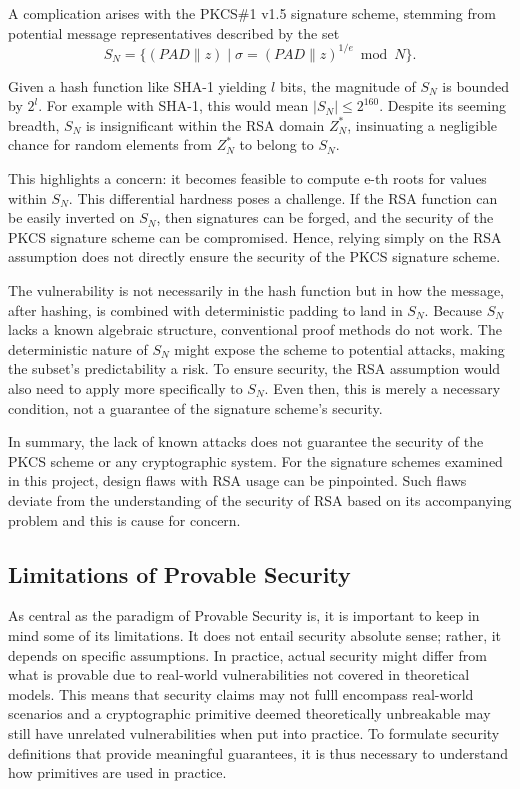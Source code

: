 \documentclass[]{final_report}
\theoremstyle{definition}
\begin{document}
A complication arises with the PKCS\#1 v1.5 signature scheme, stemming from potential message representatives described by the set
\[ S_N = \{ (PAD \| z) \mid \sigma = (PAD \| z)^{1/e} \bmod N \}. \]

Given a hash function like SHA-1 yielding $l$ bits, the magnitude of $S_N$ is bounded by $2^l$. For example with SHA-1, this would mean  $|S_N| \leq 2^{160}$. Despite its seeming breadth, $S_N$ is insignificant within the RSA domain \( Z_N^* \), insinuating a negligible chance for random elements from \( Z_N^* \) to belong to \( S_N \).

This highlights a concern: it becomes feasible to compute e-th roots for values within $S_N$. This differential hardness poses a challenge. If the RSA function can be easily inverted on  $S_N$, then signatures can be forged, and the security of the PKCS signature scheme can be compromised. Hence, relying simply on the RSA assumption does not directly ensure the security of the PKCS signature scheme. 

The vulnerability is not necessarily in the hash function but in how the message, after hashing, is combined with deterministic padding to land in \( S_N \). Because \( S_N \) lacks a known algebraic structure, conventional proof methods do not work. The deterministic nature of \( S_N \) might expose the scheme to potential attacks, making the subset's predictability a risk. To ensure security, the RSA assumption would also need to apply more specifically to  $S_N$. Even then, this is merely a necessary condition, not a guarantee of the signature scheme's security. 

In summary, the lack of known attacks does not guarantee the security of the PKCS scheme or any cryptographic system. For the signature schemes examined in this project, design flaws with RSA usage can be pinpointed. Such flaws deviate from the understanding of the security of RSA based on its accompanying problem and this is cause for concern.


\subsection{Limitations of Provable Security}
As central as the paradigm of Provable Security is, it is important to keep in mind some of its limitations. It does not entail security absolute sense; rather, it depends on specific assumptions. In practice, actual security might differ from what is provable due to real-world vulnerabilities not covered in theoretical models. This means that security claims may not fulll encompass real-world scenarios and a cryptographic primitive deemed theoretically unbreakable may still have unrelated vulnerabilities when put into practice. To formulate security definitions that provide meaningful guarantees, it is thus necessary to understand how primitives are used in practice.
\end{document}
